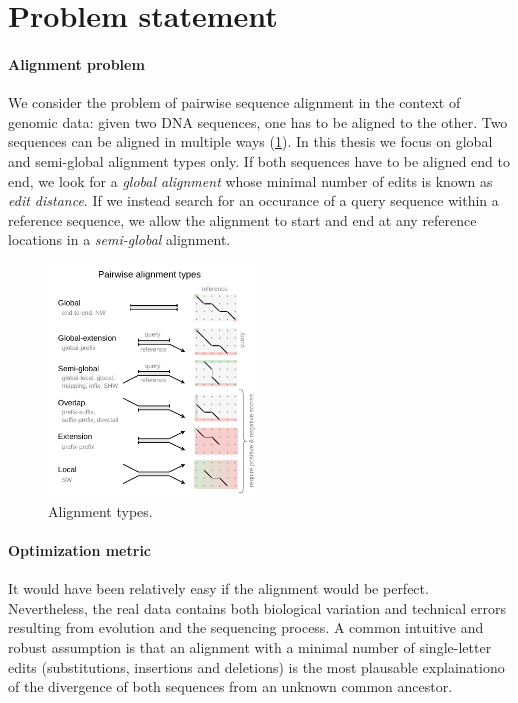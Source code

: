 \section*{Problem statement}

\paragraph{Alignment problem}
We consider the problem of pairwise sequence alignment in the context of genomic
data: given two DNA sequences, one has to be aligned to the other. Two sequences
can be aligned in multiple ways (\cref{fig:alignment-types}). In this thesis we
focus on global and semi-global alignment types only. If both sequences have to
be aligned end to end, we look for a \emph{global alignment} whose minimal
number of edits is known as \emph{edit distance}. If we instead search for an
occurance of a query sequence within a reference sequence, we allow the
alignment to start and end at any reference locations in a \emph{semi-global}
alignment.

\begin{figure}[t]  %
    \includegraphics[width=0.5\textwidth]{alignment-types}
	\caption[Alignment types]{Alignment types.}
    \label{fig:alignment-types}
\end{figure}

\paragraph{Optimization metric}
It would have been relatively easy if the alignment would be perfect.
Nevertheless, the real data contains both biological variation and technical
errors resulting from evolution and the sequencing process. A common intuitive
and robust assumption is that an alignment with a minimal number of
single-letter edits (substitutions, insertions and deletions) is the most
plausable explainationo of the divergence of both sequences from an unknown
common ancestor.

